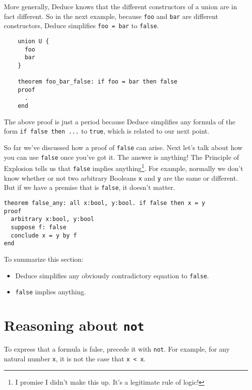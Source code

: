 \documentclass[12pt]{article}
\begin{document}
More generally, Deduce knows that the different constructors of a
union are in fact different. So in the next example, because
\texttt{foo} and \texttt{bar} are different constructors, Deduce
simplifies \texttt{foo = bar} to \texttt{false}.

\begin{verbatim}
    union U {
      foo
      bar
    }
    
    theorem foo_bar_false: if foo = bar then false
    proof
      .
    end
\end{verbatim}

The above proof is just a period because Deduce simplifies any formula
of the form \texttt{if false then ...} to \texttt{true}, which is
related to our next point.

So far we've discussed how a proof of \texttt{false} can arise.  Next
let's talk about how you can use \texttt{false} once you've got it.
The answer is anything! The Principle of Explosion tells us that
\texttt{false} implies anything\footnote{I promise I didn't make this
  up. It's a legitimate rule of logic!}. For example, normally we
don't know whether or not two arbitrary Booleans \texttt{x} and
\texttt{y} are the same or different.  But if we have a premise that
is \texttt{false}, it doesn't matter.

\begin{verbatim}
theorem false_any: all x:bool, y:bool. if false then x = y
proof
  arbitrary x:bool, y:bool
  suppose f: false
  conclude x = y by f
end
\end{verbatim}

To summarize this section:
\begin{itemize}
\item Deduce simplifies any obviously contradictory equation to \texttt{false}.
\item \texttt{false} implies anything.
\end{itemize}

\pagebreak

\section{Reasoning about \texttt{not}}
\label{sec:not}

To express that a formula is false, precede it with \texttt{not}.  For
example, for any natural number \texttt{x}, it is not the case that
\texttt{x < x}.
\end{document}
